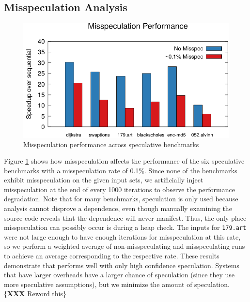 \subsection{Misspeculation Analysis}
\begin{figure}[htp]
  \includegraphics[width=\columnwidth]{figures/misspec-crop}
  \caption{Misspeculation performance across speculative benchmarks}
  \label{fig:misspec}
\end{figure}
Figure \ref{fig:misspec} shows how misspeculation affects the
performance of the six speculative benchmarks with a misspeculation rate of
0.1\%. Since none of the benchmarks exhibit misspeculation on the
given input sets, we artificially inject misspeculation at the end of
every 1000 iterations to observe the performance degradation.
Note that for many benchmarks, speculation is only used
because analysis cannot disprove a dependence, even though manually
examining the source code reveals that the dependence will never manifest.
Thus, the only place misspeculation can possibly occur is during a heap
check.
The inputs for \texttt{179.art} were not large enough to have
enough iterations for misspeculation at this rate, so we perform a
weighted average of non-misspeculating and misspeculating runs to achieve
an average corresponding to the respective rate.
These results demonstrate that \name performs well with only high
confidence speculation.
Systems that have larger overheads have a larger chance of speculation (since
they use more speculative assumptions), but we minimize the amount of speculation.
\{\textbf{XXX} Reword this\}



